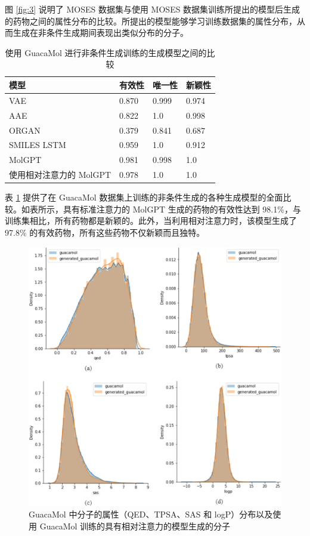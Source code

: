 \begin{translation}
图 \ref{fig:3} 说明了 MOSES 数据集与使用 MOSES 数据集训练所提出的模型后生成的药物之间的属性分布的比较。所提出的模型能够学习训练数据集的属性分布，从而生成在非条件生成期间表现出类似分布的分子。

\begin{table}[H]
  \centering
  \caption{使用 GuacaMol 进行非条件生成训练的生成模型之间的比较}
  \label{tab:2}
  \begin{tabular}{llll}
    \hline 模型       & 有效性   & 唯一性   & 新颖性   \\
    \hline VAE      & 0.870 & 0.999 & 0.974 \\
    AAE             & 0.822 & 1.0   & 0.998 \\
    ORGAN           & 0.379 & 0.841 & 0.687 \\
    SMILES LSTM     & 0.959 & 1.0   & 0.912 \\
    MolGPT          & 0.981 & 0.998 & 1.0   \\
    使用相对注意力的 MolGPT & 0.978 & 1.0   & 1.0   \\
    \hline
  \end{tabular}
\end{table}

表 \ref{tab:2} 提供了在 GuacaMol 数据集上训练的非条件生成的各种生成模型的全面比较。如表所示，具有标准注意力的 MolGPT 生成的药物的有效性达到 98.1\%，与训练集相比，所有药物都是新颖的。此外，当利用相对注意力时，该模型生成了 97.8\% 的有效药物，所有这些药物不仅新颖而且独特。

\begin{figure}[H]
  \centering
  \includegraphics[width=\linewidth]{figures/4.png}
  \caption{GuacaMol 中分子的属性（QED、TPSA、SAS 和 logP）分布以及使用 GuacaMol 训练的具有相对注意力的模型生成的分子}
  \label{fig:4}
\end{figure}


\end{translation}
